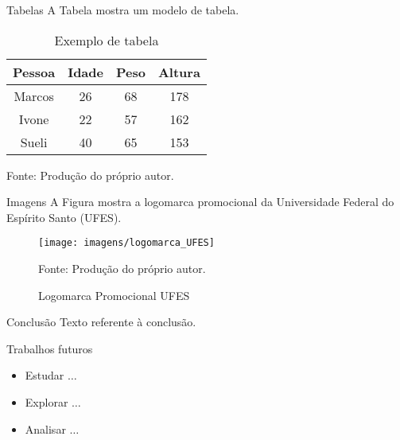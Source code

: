 \documentclass[11pt]{beamer}
\begin{document}
\begin{frame}{Tabelas}
    A Tabela mostra um modelo de tabela.

    \begin{table}[htb]
        \caption{Exemplo de tabela}
        \label{tab:modelo_tabela}
        \centering
        \begin{tabular}{c|c|c|c}
	        \hline
	        \textbf{Pessoa} & \textbf{Idade} & \textbf{Peso} & \textbf{Altura} \\ \hline
	        Marcos & 26    & 68   & 178    \\ \hline
	        Ivone  & 22    & 57   & 162    \\ \hline
	        Sueli  & 40    & 65   & 153    \\ \hline
        \end{tabular}
        
        \medskip
        
        Fonte: Produção do próprio autor.
    \end{table}
\end{frame}

\begin{frame}{Imagens}
    A Figura mostra a logomarca promocional da Universidade Federal do Espírito Santo (UFES).
    
    \begin{figure}[htb]
        \caption{Logomarca Promocional UFES}
        \label{fig:logo_UFES}
        \centering
        \texttt{[image: imagens/logomarca\_UFES]}
        
        \medskip
        
        Fonte: Produção do próprio autor.
    \end{figure}
\end{frame}

\begin{frame}{Conclusão}
    Texto referente à conclusão.
\end{frame}

\begin{frame}{Trabalhos futuros}
    \begin{itemize}
        \item Estudar $\ldots$
        
        \medskip
        
        \item Explorar $\ldots$
        
        \medskip
        
        \item Analisar $\ldots$
    \end{itemize}
\end{frame}
\end{document}
